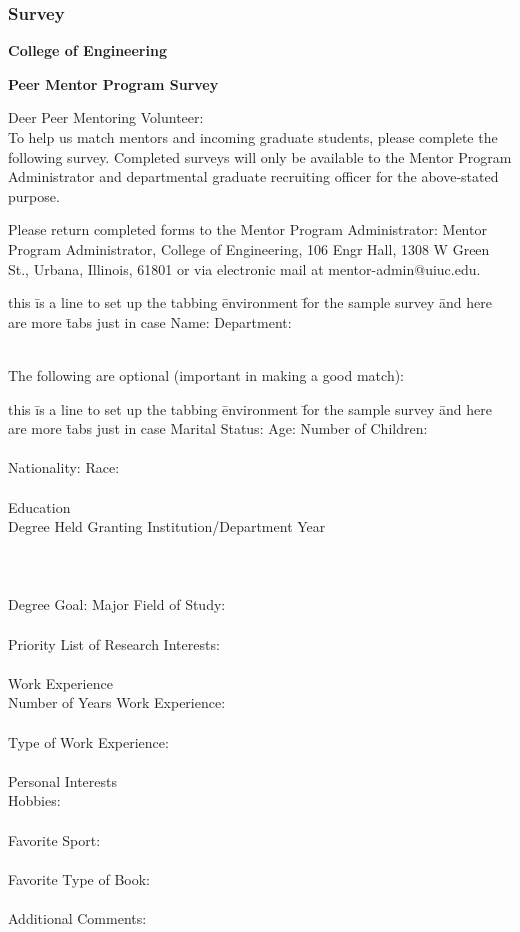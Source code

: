 \eject
\subsubsection{ Survey}
\label{survey}
\centerline{\large\bf College of Engineering}
\centerline{\large\bf Peer Mentor Program Survey}
\medskip
\noindent
Deer Peer Mentoring Volunteer: \\

\noindent
To help us match mentors and incoming graduate students,
please complete the following survey.  
Completed surveys will only be available to the
Mentor Program Administrator and departmental
graduate recruiting officer for the above-stated purpose.  

\medskip
\noindent
Please return completed forms to the Mentor Program Administrator: Mentor 
Program Administrator, College of Engineering, 106 Engr Hall, 1308 W Green St., 
Urbana, Illinois, 61801 or via electronic mail at mentor-admin@uiuc.edu.

\smallskip
\noindent
\begin{tabbing}
this \=is a line to set up the tabbing \=environment \=for the sample survey
\= and here are more \= tabs just in case \kill
Name: \>\>  \> Department: \\
\\
\end{tabbing}
\noindent
The following are optional (important in making a good match):
\begin{tabbing}
this \=is a line to set up the tabbing \=environment \=for the sample survey
\= and here are more \= tabs just in case \kill
Marital Status: \>\>Age: \> Number of Children: \\
\\
Nationality: \>\> Race: \\ 
\\
Education \\
\> Degree Held  \> Granting Institution/Department \>\> Year \\
\\
\\
\\
\> Degree Goal: \> Major Field of Study:  \\
\\
\> Priority List of Research Interests: \\
\\
Work Experience \\
\> Number of Years Work Experience: \\
\\
\> Type of Work Experience:  \\
\\
Personal Interests \\
\> Hobbies: \\
\\
\> Favorite Sport: \\
\\
\> Favorite Type of Book: \\
\\
Additional Comments: \\
\end{tabbing}


